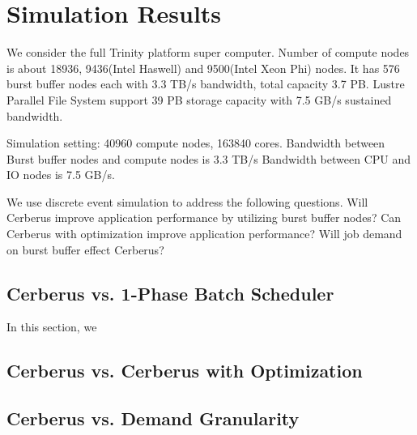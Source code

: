 \section{Simulation Results}
We consider the full Trinity platform super computer.
Number of compute nodes is about 18936, 9436(Intel Haswell) and 9500(Intel Xeon Phi) nodes.
It has 576 burst buffer nodes each with 3.3 TB/s bandwidth, total capacity 3.7 PB.
Lustre Parallel File System support 39 PB storage capacity with 7.5 GB/s sustained bandwidth.

Simulation setting:
40960 compute nodes, 163840 cores.
Bandwidth between Burst buffer nodes and compute nodes is 3.3 TB/s
Bandwidth between CPU and IO nodes is 7.5 GB/s.

We use discrete event simulation to address the following questions.
Will Cerberus improve application performance by utilizing burst buffer nodes?
Can Cerberus with optimization improve application performance?
Will job demand on burst buffer effect Cerberus?

\subsection{Cerberus vs. 1-Phase Batch Scheduler}
In this section, we 

\subsection{Cerberus vs. Cerberus with Optimization}


\subsection{Cerberus vs. Demand Granularity}

